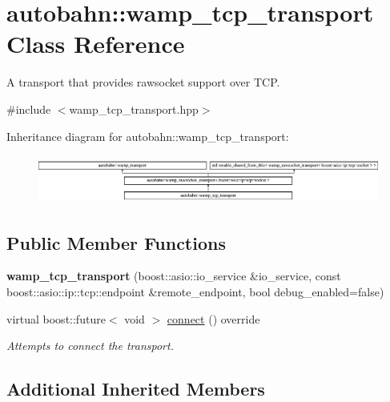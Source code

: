 \hypertarget{classautobahn_1_1wamp__tcp__transport}{}\section{autobahn\+:\+:wamp\+\_\+tcp\+\_\+transport Class Reference}
\label{classautobahn_1_1wamp__tcp__transport}


A transport that provides rawsocket support over T\+CP.  




{\ttfamily \#include $<$wamp\+\_\+tcp\+\_\+transport.\+hpp$>$}

Inheritance diagram for autobahn\+:\+:wamp\+\_\+tcp\+\_\+transport\+:\begin{figure}[H]
\begin{center}
\leavevmode
\includegraphics[height=1.600000cm]{classautobahn_1_1wamp__tcp__transport}
\end{center}
\end{figure}
\subsection*{Public Member Functions}
\begin{DoxyCompactItemize}
\item 
{\bfseries wamp\+\_\+tcp\+\_\+transport} (boost\+::asio\+::io\+\_\+service \&io\+\_\+service, const boost\+::asio\+::ip\+::tcp\+::endpoint \&remote\+\_\+endpoint, bool debug\+\_\+enabled=false)\hypertarget{classautobahn_1_1wamp__tcp__transport_a63d9d2467d2053b2536106d03cad5990}{}\label{classautobahn_1_1wamp__tcp__transport_a63d9d2467d2053b2536106d03cad5990}

\item 
virtual boost\+::future$<$ void $>$ \hyperlink{classautobahn_1_1wamp__tcp__transport_af2dbaa2cbc0d144e15995061c01a8ce1}{connect} () override
\begin{DoxyCompactList}\small\item\em Attempts to connect the transport. \end{DoxyCompactList}\end{DoxyCompactItemize}
\subsection*{Additional Inherited Members}


